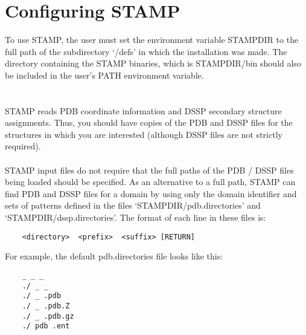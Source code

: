     \section{Configuring STAMP}

    To use STAMP, the user must set the environment variable
    STAMPDIR to the full path of the subdirectory `/defs' in which 
    the installation was made.  The directory containing the STAMP binaries,
    which is STAMPDIR/bin should also be included in the user's PATH
    environment variable.\\ 
    \\
    \\
    STAMP reads PDB coordinate information and DSSP secondary structure assignments. 
    Thus, you should have copies of the PDB
    and DSSP files for the structures in which you are interested
    (although DSSP files are not strictly required).\\
    \\
    STAMP input files do not require that the full paths of the PDB / DSSP files being loaded
    should be specified. As an alternative to a full path, STAMP can find PDB and DSSP files for a domain by
    using only the domain identifier and sets of patterns defined in the files `STAMPDIR/pdb.directories' and `STAMPDIR/dssp.directories'. The format of each line in these files is:\\

    \begin{scriptsize}\begin{verbatim}
    <directory>  <prefix>  <suffix> [RETURN]
    \end{verbatim} \end{scriptsize}

    For example, the default pdb.directories file looks like this:\\

    \begin{scriptsize}\begin{verbatim}
    _ _ _
    ./ _ _
    ./ _ .pdb
    ./ _ .pdb.Z
    ./ _ .pdb.gz
    ./ pdb .ent
    \end{verbatim} \end{scriptsize}

